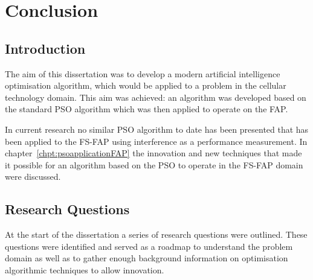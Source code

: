 \chapter{Conclusion}
\label{chpt:conclusion}
\section{Introduction}
The aim of this dissertation was to develop a modern artificial intelligence optimisation algorithm, which would be applied to a problem in the cellular technology domain. This aim was achieved: an algorithm was developed based on the standard \gls{PSO} algorithm which was then applied to operate on the FAP. 

In current research no similar PSO algorithm to date has been presented that has been applied to the FS-FAP using interference as a performance measurement. In chapter~\ref{chpt:psoapplicationFAP} the innovation and new techniques that made it possible for an algorithm based on the PSO to operate in the FS-FAP domain were discussed.

\section{Research Questions}
At the start of the dissertation a series of research questions were outlined. These questions were identified and served as a roadmap to understand the problem domain as well as to gather enough background information on optimisation algorithmic techniques to allow innovation.

